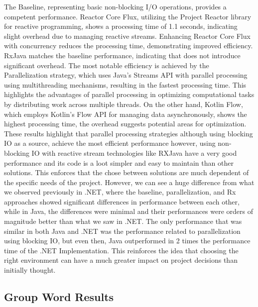 The Baseline, representing basic non-blocking I/O operations, provides a competent performance. Reactor Core Flux, utilizing the Project Reactor library for reactive programming, shows a processing time of 1.1 seconds, indicating slight overhead due to managing reactive streams. Enhancing Reactor Core Flux with concurrency reduces the processing time, demonstrating improved efficiency.
RxJava matches the baseline performance, indicating that does not introduce significant overhead. The most notable efficiency is achieved by the Parallelization strategy, which uses Java's Streams API with parallel processing using multithreading mechanisms, resulting in the fastest processing time. This highlights the advantages of parallel processing in optimizing computational tasks by distributing work across multiple threads.
On the other hand, Kotlin Flow, which employs Kotlin's Flow API for managing data asynchronously, shows the highest processing time, the overhead suggests potential areas for optimization.
These results highlight that parallel processing strategies although using blocking IO as a source, achieve the most efficient performance however, using non-blocking IO with reactive stream technologies like RXJava have a very good performance and its code is a loot simpler and easy to maintain than other solutions. This enforces that the chose between solutions are much dependent of the specific needs of the project.
However, we can see a huge difference from what we observed previously in .NET, where the baseline, parallelization, and Rx approaches showed significant differences in performance between each other, while in Java, the differences were minimal and their performances were orders of magnitude better than what we saw in .NET. The only performance that was similar in both Java and .NET was the performance related to parallelization using blocking IO, but even then, Java outperformed in 2 times the performance time of the .NET Implementation.
This reinforces the idea that choosing the right environment can have a much greater impact on project decisions than initially thought.

    \subsection{Group Word Results}
    \label{subsubsec:group_word_results}
    
